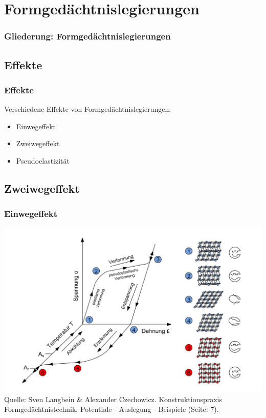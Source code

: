 \section{Formgedächtnislegierungen}

\begin{frame}[t]\frametitle{Gliederung: Formgedächtnislegierungen}
\tableofcontents[
currentsection,
subsectionstyle=show/show/hide
]
\end{frame}

\subsection{Effekte}
\label{fgl:effekte}
\begin{frame}[c]\frametitle{Effekte}
	Verschiedene Effekte von Formgedächtnislegierungen:
	\begin{itemize}
		\item{Einwegeffekt}
		\item{Zweiwegeffekt}
		\item{Pseudoelastizität}
	\end{itemize}
\end{frame}

\subsection{Zweiwegeffekt}
\label{fgl:zweiwegeffekt}
\begin{frame}[t]\frametitle{Einwegeffekt}
	\centering
	\includegraphics[height=0.5\textwidth]{medien/Verhalten_beim_Einwegeffekt.png}
	\\
	\tiny{Quelle: Sven Langbein \& Alexander Czechowicz. Konstruktionspraxis
	Formgedächtnistechnik. Potentiale - Auslegung - Beispiele (Seite: 7).}
\end{frame}

